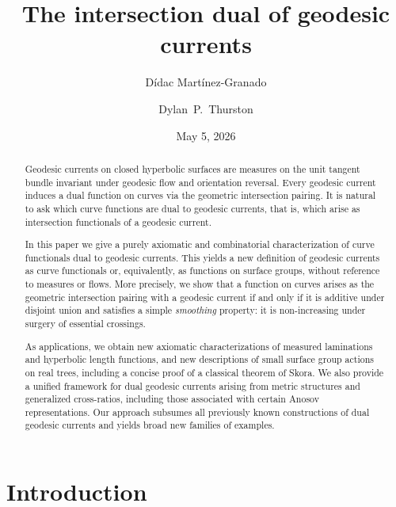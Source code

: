 \documentclass[11pt]{amsart}
\numberwithin{equation}{section}
\numberwithin{figure}{section}
\theoremstyle{definition}
\theoremstyle{plain}
\begin{document}
\title{The intersection dual of geodesic currents} 
\author[Martínez-Granado]{Dídac Martínez-Granado}
\address{Department of Mathematics\\University of Luxembourg\\Av. de la Fonte 6, Esch-sur-Alzette, L-4364, Luxembourg}       

\author[Thurston]{Dylan~P.~Thurston}
\address{Department of Mathematics\\
  Boston College\\
  Chestnut Hill, Mass. 02467-3806\\
  USA}
\date{May 5, 2026}
\begin{abstract}
Geodesic currents on closed hyperbolic surfaces are measures on the
unit tangent bundle invariant
under geodesic flow and orientation reversal.
Every geodesic current induces a dual function on curves via the
geometric intersection pairing. It is natural to ask which curve
functions are dual to geodesic currents, that is, which arise as
intersection functionals of a geodesic current.

In this paper we give a purely axiomatic and combinatorial
characterization of curve functionals dual to geodesic currents. This
yields a new definition of geodesic currents as curve functionals or,
equivalently, as functions on surface groups, without reference to
measures or flows. More precisely, we show that a function on curves
arises as the geometric intersection pairing with a geodesic current
if and only if it is additive under disjoint union and satisfies a
simple \emph{smoothing} property: it is non-increasing under
surgery of essential crossings.

As applications, we obtain new axiomatic characterizations of measured
laminations and hyperbolic length functions, and new descriptions of small
surface group actions on real trees, including a concise proof of a
classical theorem of Skora. We also provide a unified framework for
dual geodesic currents arising from metric structures and generalized
cross-ratios, including those associated with certain Anosov
representations. Our approach subsumes all previously
known constructions of dual geodesic currents and yields broad new
families of examples.
\end{abstract}
\maketitle


\section{Introduction}
\end{document}
